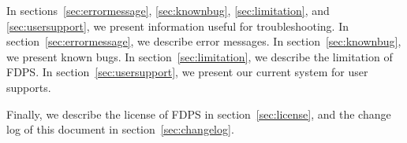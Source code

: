 In
sections~\ref{sec:errormessage}, \ref{sec:knownbug}, \ref{sec:limitation},
and \ref{sec:usersupport}, we present information useful for
troubleshooting.  In section~\ref{sec:errormessage}, we describe error
messages. In section~\ref{sec:knownbug}, we present known bugs. In
section~\ref{sec:limitation}, we describe the limitation of FDPS. In
section~\ref{sec:usersupport}, we present our current system for user
supports.

Finally, we describe the license of FDPS in section~\ref{sec:license},
and the change log of this document in section~\ref{sec:changelog}.

